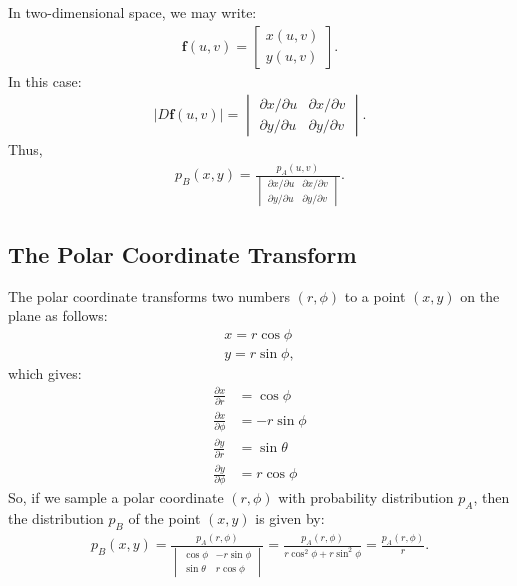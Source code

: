 \documentclass[10pt]{article}
\newcommand{\ve}[1]{\mathbf{#1}}
\begin{document}
  In two-dimensional space, we may write:
  \begin{align*}
    \ve{f}(u,v) = \begin{bmatrix}
      x(u,v) \\ y(u,v)
    \end{bmatrix}.
  \end{align*}
  In this case:
  \begin{align*}
    | D \ve{f}(u,v) | = \begin{vmatrix}
      \partial x / \partial u & \partial x / \partial v \\
      \partial y / \partial u & \partial y / \partial v
    \end{vmatrix}.
  \end{align*}
  Thus,
  \begin{align*}
    p_B(x,y) = \frac{p_A(u,v)}{\begin{vmatrix}
      \partial x / \partial u & \partial x / \partial v \\
      \partial y / \partial u & \partial y / \partial v
    \end{vmatrix}}.
  \end{align*}

  \subsection{The Polar Coordinate Transform}

  The polar coordinate transforms two numbers $(r, \phi)$ to a point $(x,y)$ on the plane as follows:
  \begin{align*}
    x = r \cos\phi \\
    y = r \sin\phi,
  \end{align*}
  which gives:
  \begin{align*}
    \frac{\partial x}{\partial r} &= \cos\phi \\
    \frac{\partial x}{\partial \phi} &= -r \sin\phi \\
    \frac{\partial y}{\partial r} &= \sin\theta \\
    \frac{\partial y}{\partial \phi} &= r \cos\phi
  \end{align*}
  So, if we sample a polar coordinate $(r,\phi)$ with probability distribution $p_A$, then the distribution $p_B$ of the point $(x,y)$ is given by:
  \begin{align*}
    p_B(x,y) 
    = \frac{p_A(r, \phi)}{\begin{vmatrix}
      \cos\phi & -r\sin\phi \\
      \sin\theta & r\cos\phi
    \end{vmatrix}}
    = \frac{p_A(r,\phi)}{r\cos^2 \phi + r \sin^2\phi}
    = \frac{p_A(r,\phi)}{r}.
  \end{align*}
\end{document}
